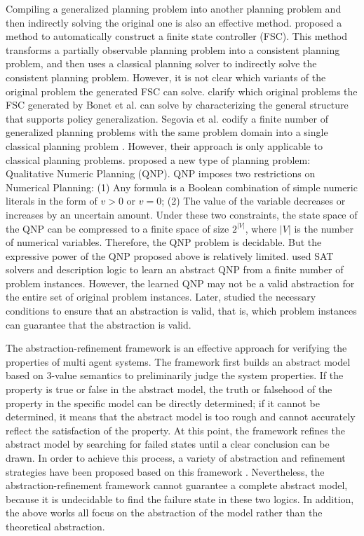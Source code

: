 \documentclass[review]{elsarticle}
\begin{document}
Compiling a generalized planning problem into another planning problem and then indirectly solving the original one is also an effective method.
\citet{BonPG2009} proposed a method to automatically construct a finite state controller (FSC). This method transforms a partially observable planning problem into a consistent planning problem, and then uses a classical planning solver to indirectly solve the consistent planning problem. 
However, it is not clear which variants of the original problem the generated FSC can solve. \citet{BonG2015} clarify which original problems the FSC generated by Bonet et al. \cite{BonPG2009} can solve by characterizing the general structure that supports policy generalization.
Segovia et al. 
codify a finite number of generalized planning problems with the same problem domain into a single classical planning problem \cite{SegJJ2016,SegJJ2019,SegJJ2021}. 
However, their approach is only applicable to classical planning problems. \citet{SriZIG2011} proposed a new type of planning problem: Qualitative Numeric Planning (QNP). 
QNP imposes two restrictions on Numerical Planning:
(1) Any formula is a Boolean combination of simple numeric literals in the form of $v > 0$ or $v = 0$; 
(2) The value of the variable decreases or increases by an uncertain amount. Under these two constraints, the state space of the QNP can be compressed to a finite space of size $2^{|V|}$, where $|V|$ is the number of numerical variables. 
Therefore, the QNP problem is decidable. 
But the expressive power of the QNP proposed above is relatively limited. \citet{BonFG2019} used SAT solvers and description logic to learn an abstract QNP from a finite number of problem instances. 
However, the learned QNP may not be a valid abstraction for the entire set of original problem instances. Later, \citet{BonFEB2019} studied the necessary conditions to ensure that an abstraction is valid, that is, which problem instances can guarantee that the abstraction is valid.

The abstraction-refinement framework is an effective approach for verifying the properties of multi agent systems. 
The framework first builds an abstract model based on 3-value semantics to preliminarily judge the system properties. 
If the property is true or false in the abstract model, the truth or falsehood of the property in the specific model can be directly determined; 
if it cannot be determined, it means that the abstract model is too rough and cannot accurately reflect the satisfaction of the property. 
At this point, the framework refines the abstract model by searching for failed states until a clear conclusion can be drawn. 
In order to achieve this process, a variety of abstraction and refinement strategies have been proposed based on this framework \cite{lomM2014, lomM2016, BelLM2016, BelFM2023}. 
Nevertheless, the abstraction-refinement framework cannot guarantee a complete abstract model, because it is undecidable to find the failure state in these two logics. 
In addition, the above works all focus on the abstraction of the model rather than the theoretical abstraction.
\end{document}
